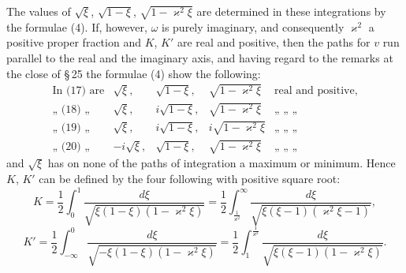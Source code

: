 
The values of $\sqrt{\xi}$, $\sqrt{1-\xi}$, $\sqrt{1-\varkappa^2\xi}$ are determined in these
 integrations by the formulae (4). If, however, $\omega$ is purely
imaginary, and consequently $\varkappa^2$ a positive proper fraction and
$K$, $K'$ are real and positive, then the paths for $v$ run parallel to the real
and the imaginary axis, and having regard to the remarks
 at the close of \S\,25 the formulae (4) show the following:
\[
\begin{array}{lcccl}
\text{In (17) are} & \sqrt{\xi}, & \sqrt{1-\xi}, & \sqrt{1-\varkappa^2\xi} & \text{real and positive,}\\
\text{„ (18) „} & \sqrt{\xi}, & i\sqrt{1-\xi}, & \sqrt{1-\varkappa^2\xi} & \text{„ „ „}\\
\text{„ (19) „} & \sqrt{\xi}, & i\sqrt{1-\xi}, & i\sqrt{1-\varkappa^2\xi} & \text{„ „ „}\\
\text{„ (20) „} & -i\sqrt{\xi}, & \sqrt{1-\xi}, & \sqrt{1-\varkappa^2\xi} & \text{„ „ „}
\end{array}
\]
and $\sqrt{\xi}$ has on none of the paths of integration a maximum or
minimum. Hence $K$, $K'$ can be defined by the four following
 with positive square root:
\[
K = \frac{1}{2}\int_0^1 \frac{d\xi}{\sqrt{\xi(1-\xi)(1-\varkappa^2\xi)}} = \frac{1}{2}\int_{\frac{1}{\varkappa^2}}^{\infty} \frac{d\xi}{\sqrt{\xi(\xi-1)(\varkappa^2\xi-1)}},
\]
\[
K' = \frac{1}{2}\int_{-\infty}^{0} \frac{d\xi}{\sqrt{-\xi(1-\xi)(1-\varkappa^2\xi)}} = \frac{1}{2}\int_1^{\frac{1}{\varkappa^2}} \frac{d\xi}{\sqrt{\xi(\xi-1)(1-\varkappa^2\xi)}}.
\]
